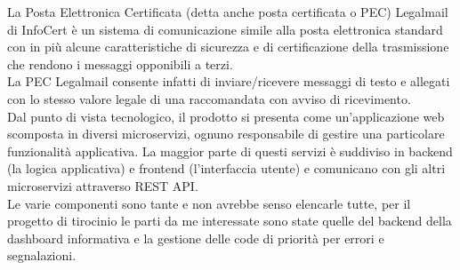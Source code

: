 La Posta Elettronica Certificata (detta anche posta certificata o PEC) Legalmail di InfoCert è un sistema di comunicazione simile alla posta elettronica standard con in più alcune caratteristiche di sicurezza e di certificazione della trasmissione che rendono i messaggi opponibili a terzi.\\
La PEC Legalmail consente infatti di inviare/ricevere messaggi di testo e allegati con lo stesso valore legale di una raccomandata con avviso di ricevimento. \\
Dal punto di vista tecnologico, il prodotto si presenta come un'applicazione web scomposta in diversi \gls{microservizi}, ognuno responsabile di gestire una particolare funzionalità applicativa.
La maggior parte di questi servizi è suddiviso in backend (la logica applicativa) e frontend (l'interfaccia utente) e comunicano con gli altri microservizi attraverso REST API.\\
Le varie componenti sono tante e non avrebbe senso elencarle tutte, per il progetto di tirocinio le parti da me interessate sono state quelle del backend della dashboard informativa e la gestione delle code di priorità per errori e segnalazioni.
